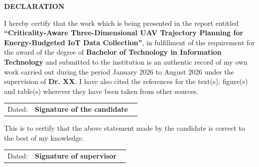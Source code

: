 
\begin{center}
{\Large \bf DECLARATION}
\end{center}
\vspace{0.5cm}
\noindent I hereby certify that the work which is being presented in the report entitled \textbf{``Criticality-Aware Three-Dimensional UAV Trajectory Planning for Energy-Budgeted IoT Data Collection''}, in fulfillment of the requirement for the award of the degree of \textbf{Bachelor of Technology in Information Technology} and submitted to the institution is an authentic record of my own work carried out during the period January 2026 to August 2026 under the supervision of \textbf{Dr. XX}. I have also cited the references for the text(s), figure(s) and table(s) wherever they have been taken from other sources.

\vspace{1cm}

\begin{center}
	\begin{tabular}{p{}p{}}
		Dated:  & {\bf{Signature of the candidate}} \
	\end{tabular}
\end{center}
\vspace{1.5cm}
\noindent This is to certify that the above statement made by the candidate is correct to the best of my knowledge.

\vspace{1.5cm}

\begin{center}
	\begin{tabular}{p{}p{}}
		Dated: & {\bf{Signature of supervisor}} \
	\end{tabular}
\end{center}
